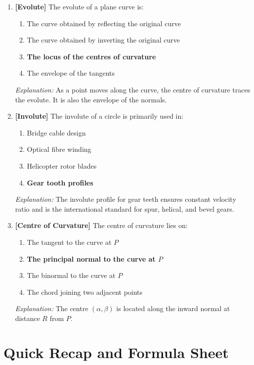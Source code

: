 \documentclass[12pt,a4paper]{article}
\begin{document}
\begin{enumerate}[label=\textbf{Q\arabic*.}]
\bigskip
\item \textbf{[Evolute]} The evolute of a plane curve is:
\begin{enumerate}[label=(\Alph*), nosep]
  \item The curve obtained by reflecting the original curve
  \item The curve obtained by inverting the original curve
  \item \textbf{The locus of the centres of curvature}
  \item The envelope of the tangents
\end{enumerate}
\textit{Explanation:} As a point moves along the curve, the centre of curvature traces the evolute. It is also the envelope of the normals.

\bigskip
\item \textbf{[Involute]} The involute of a circle is primarily used in:
\begin{enumerate}[label=(\Alph*), nosep]
  \item Bridge cable design
  \item Optical fibre winding
  \item Helicopter rotor blades
  \item \textbf{Gear tooth profiles}
\end{enumerate}
\textit{Explanation:} The involute profile for gear teeth ensures constant velocity ratio and is the international standard for spur, helical, and bevel gears.

\bigskip
\item \textbf{[Centre of Curvature]} The centre of curvature lies on:
\begin{enumerate}[label=(\Alph*), nosep]
  \item The tangent to the curve at $P$
  \item \textbf{The principal normal to the curve at $P$}
  \item The binormal to the curve at $P$
  \item The chord joining two adjacent points
\end{enumerate}
\textit{Explanation:} The centre $(\alpha,\beta)$ is located along the inward normal at distance $R$ from $P$.

\end{enumerate}

\section{Quick Recap and Formula Sheet}
\end{document}

